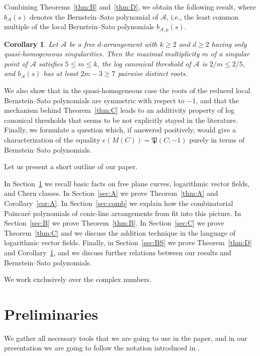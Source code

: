 \documentclass[11pt]{amsart}
\newtheorem{corollary}[theorem]{Corollary}
\theoremstyle{definition}
\numberwithin{equation}{section}
\newcommand{\cA}{\mathcal{A}}
\newcommand{\Pfrak}{\mathfrak{P}}
\newcommand{\gadd}[1]{#1}
\begin{document}
Combining Theorems~\ref{thm:B} and~\ref{thm:D}, we obtain the following result, where $b_\cA(s)$ denotes the Bernstein--Sato polynomial of $\cA$, i.e., the least common multiple of the local Bernstein--Sato polynomials $b_{\cA,p}(s)$.

\begin{corollary}\label{cor:D}
Let $\cA$ be a free $d$-arrangement with $k\ge2$ and $d\ge2$ having only quasi-homogeneous singularities.
Then the maximal multiplicity $m$ of a singular point of $\cA$ satisfies $5\le m\le k$, \gadd{the log canonical threshold of $\cA$ is $2/m\le 2/5$,} and $b_\cA(s)$ has at least $2m-3\ge7$ pairwise distinct roots.
\end{corollary}

We also show that in the quasi-homogeneous case the roots of the reduced local Bernstein--Sato polynomials are symmetric with respect to $-1$, and that the mechanism behind Theorem~\ref{thm:C} leads to an additivity property of log canonical thresholds that seems to be not explicitly stayed in the literature. Finally, we formulate a question which, if answered positively, would give a characterization of the equality $e(M(C))=\Pfrak(C;-1)$ purely in terms of Bernstein--Sato polynomials.

Let us present a short outline of our paper.


In Section~\ref{sec:prel} we recall basic facts on free plane curves, logarithmic vector fields, and Chern classes.
In Section~\ref{sec:A} we prove Theorem~\ref{thm:A} and Corollary~\ref{cor:A}.
In Section~\ref{sec:comb} we explain how the combinatorial Poincar\'e polynomials of conic-line arrangements from \cite{Po25} fit into this picture.
In Section~\ref{sec:B} we prove Theorem~\ref{thm:B}.
In Section~\ref{sec:C} we prove Theorem~\ref{thm:C} and we discuss the addition technique in the language of logarithmic vector fields.
Finally, in Section~\ref{sec:BS} we prove Theorem~\ref{thm:D} and Corollary~\ref{cor:D}, and we discuss further relations between our results and Bernstein--Sato polynomials.

We work exclusively over the complex numbers.

\section{Preliminaries}\label{sec:prel}

We gather all necessary tools that we are going to use in the paper, and in our presentation we are going to follow the notation introduced in \cite{Di17}.
\end{document}
